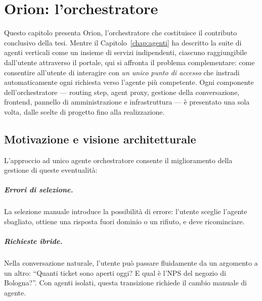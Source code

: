 
\chapter{Orion: l'orchestratore}
\label{chap:orion}

Questo capitolo presenta Orion, l'orchestratore che costituisce il
contributo conclusivo della tesi. Mentre il Capitolo~\ref{chap:agenti} ha
descritto la suite di agenti verticali come un insieme di servizi
indipendenti, ciascuno raggiungibile dall'utente attraverso il portale, qui
si affronta il problema complementare: come consentire all'utente di
interagire con \emph{un unico punto di accesso} che instradi automaticamente
ogni richiesta verso l'agente più competente. Ogni componente
dell'orchestratore --- routing step, agent proxy, gestione della
conversazione, frontend, pannello di amministrazione e infrastruttura --- è
presentato una sola volta, dalle scelte di progetto fino alla realizzazione.

\section{Motivazione e visione architetturale}
\label{sec:orion-motivazione}

L'approccio ad unico agente orchestratore consente il miglioramento della gestione di queste eventualità:

\paragraph{Errori di selezione.}
La selezione manuale introduce la possibilità di errore: l'utente sceglie l'agente sbagliato,
ottiene una risposta fuori dominio o un rifiuto, e deve ricominciare.


\paragraph{Richieste ibride.} Nella conversazione naturale, l'utente può passare fluidamente da un argomento
a un altro: ``Quanti ticket sono aperti oggi? E qual è l'NPS del negozio di Bologna?''.
Con agenti isolati, questa transizione richiede il cambio manuale di agente.

